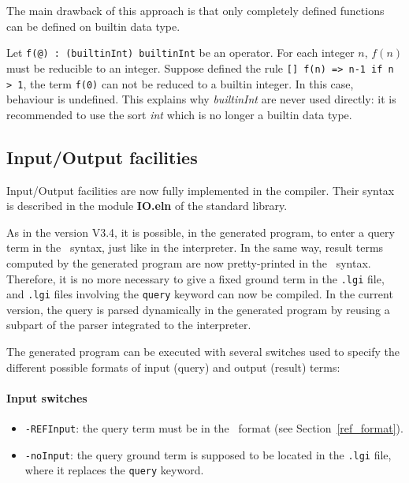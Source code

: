 The main drawback of this approach is that only completely defined
functions can be defined on builtin data type.

Let \texttt{f(@) : (builtinInt) builtinInt} be an operator. 
For each integer $n$, $f(n)$ must be reducible to an integer. Suppose
defined the rule 
\texttt{[] f(n) => n-1 if n > 1}, the term \texttt{f(0)} can not be
reduced to a builtin integer. In this case, behaviour is undefined.
This explains why \textit{builtinInt} are never used directly: it is
recommended to use the sort \textit{int} which is no longer a builtin
data type.


\subsection{Input/Output facilities}
\label{IO switches}
Input/Output facilities are now fully  implemented in the compiler. 
Their syntax is described in the module {\bf IO.eln} of the standard library. 

As in the version V3.4, it is possible, in the generated 
program, to enter a query term in the \elan\ syntax, just like in the
interpreter. In the same way, result terms computed by the generated
program are now pretty-printed in the \elan\ syntax. Therefore, it is
no more necessary to give a fixed ground term in the \verb|.lgi| file, 
and \verb|.lgi| files involving the \verb|query| keyword can now be
compiled. In the current version, the query is parsed dynamically in 
the generated program by reusing a subpart of the parser integrated to
the interpreter. 

The generated program can be executed with several switches used to
specify the different possible formats of input (query) and output
(result) terms:

\paragraph{Input switches}

\begin{itemize}

\item \verb|-REFInput|: the query term must be in the \REF\ 
  format (see Section~\ref{ref_format}). 

\item \verb|-noInput|: the query ground term is supposed to 
  be located in the \verb|.lgi| file, where it replaces the
  \verb|query| keyword. 


\end{itemize}



